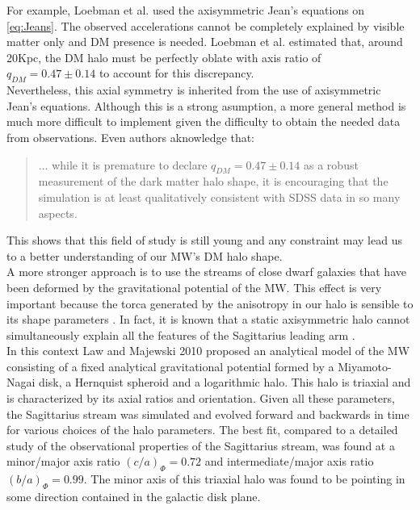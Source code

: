For example, Loebman et al. \cite{Loebman_et_al._2012} used the axisymmetric Jean's equations on \eqref{eq:Jeans}. 
The observed accelerations cannot be completely explained by visible matter only and DM presence is needed. Loebman et al. estimated that, around 20Kpc, the DM halo must be perfectly oblate with axis ratio of $q_{DM}=0.47 \pm 0.14$ to account for this discrepancy.\\

Nevertheless, this axial symmetry is inherited from the use of axisymmetric Jean's equations. 
Although this is a strong asumption, a more general method is much more difficult to implement given the difficulty to obtain the needed data from observations. 
Even authors aknowledge that:

\blockquote{... while it is premature to declare $q_{DM}=0.47 \pm 0.14$ as a robust measurement of the dark matter halo shape, it is encouraging that the simulation is at least qualitatively consistent with SDSS data in so many aspects.}

This shows that this field of study is still young and any constraint may lead us to a better understanding of our MW's DM halo shape.\\

A more stronger approach is to use the streams of close dwarf galaxies that have been deformed by the gravitational potential of the MW. 
This effect is very important because the torca generated by the anisotropy in our halo is sensible to its shape parameters \cite{Law_and_Majewski_2009,Law_and_Majewski_2010,Deg_and_Lawrence_2013}. 
In fact, it is known that a static axisymmetric halo cannot simultaneously explain all the features of the Sagittarius leading arm \cite{Law_and_Majewski_2009}. \\

In this context Law and Majewski 2010 proposed an analytical model of the MW consisting of a fixed analytical gravitational potential formed by a Miyamoto-Nagai \cite{Miyamoto_and_Nagai_1975} disk, a Hernquist spheroid and a logarithmic halo. 
This halo is triaxial and is characterized by its axial ratios and orientation. 
Given all these parameters, the Sagittarius stream was simulated and evolved forward and backwards in time for various choices of the halo parameters. 
The best fit, compared to a detailed study of the observational properties of the Sagittarius stream, was found at a minor/major axis ratio $(c/a)_{\Phi}=0.72$ and intermediate/major axis ratio $(b/a)_{\Phi}=0.99$. The minor axis of this triaxial halo was found to be pointing in some direction contained in the galactic disk plane. \\

